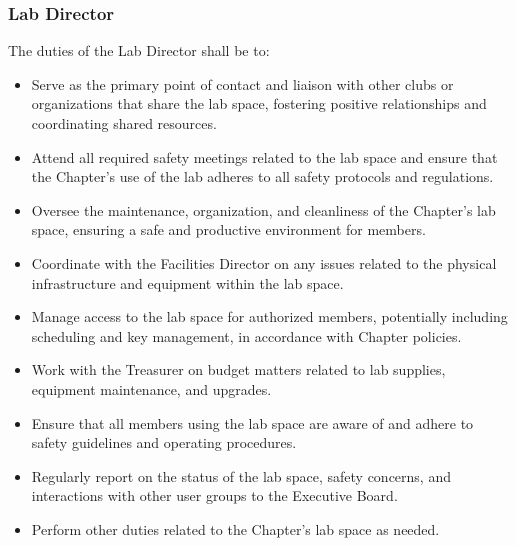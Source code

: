 \documentclass[10pt, oneside]{article}
\begin{document}
\subsubsection{Lab Director}
The duties of the Lab Director shall be to:
\begin{itemize}
    \item Serve as the primary point of contact and liaison with other clubs or organizations that share the lab space, fostering positive relationships and coordinating shared resources.
    \item Attend all required safety meetings related to the lab space and ensure that the Chapter's use of the lab adheres to all safety protocols and regulations.
    \item Oversee the maintenance, organization, and cleanliness of the Chapter's lab space, ensuring a safe and productive environment for members.
    \item Coordinate with the Facilities Director on any issues related to the physical infrastructure and equipment within the lab space.
    \item Manage access to the lab space for authorized members, potentially including scheduling and key management, in accordance with Chapter policies.
    \item Work with the Treasurer on budget matters related to lab supplies, equipment maintenance, and upgrades.
    \item Ensure that all members using the lab space are aware of and adhere to safety guidelines and operating procedures.
    \item Regularly report on the status of the lab space, safety concerns, and interactions with other user groups to the Executive Board.
    \item Perform other duties related to the Chapter's lab space as needed.
\end{itemize}
\end{document}
